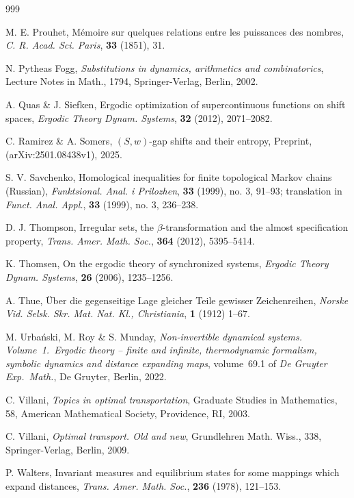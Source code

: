 \documentclass[reqno,11pt]{amsart}
\theoremstyle{definition}
\theoremstyle{remark}
\theoremstyle{remark}
\numberwithin{equation}{section}
\begin{document}
\begin{thebibliography}{999}
	
M. E. Prouhet,
M\'emoire sur quelques relations entre les puissances des
 nombres, {\it C. R. Acad. Sci. Paris}, {\bf 33} (1851), 31.

N. Pytheas Fogg,
{\it Substitutions in dynamics, arithmetics and combinatorics},
Lecture Notes in Math., 1794,
Springer-Verlag, Berlin, 2002.

A. Quas \& J. Siefken, 
Ergodic optimization of supercontinuous functions on shift spaces, 
{\it Ergodic Theory Dynam. Systems}, {\bf 32} (2012), 2071--2082.

 C. Ramirez \& A. Somers, $(S,w)$-gap shifts and their entropy,
Preprint, (arXiv:2501.08438v1), 2025.	

	 S. V. Savchenko, Homological inequalities for finite topological Markov chains
    (Russian), {\it Funktsional. Anal. i Prilozhen}, {\bf 33} (1999), no. 3, 91--93; translation in
{\it Funct. Anal. Appl.}, {\bf 33} (1999), no. 3, 236--238.

	


 D. J. Thompson, 
Irregular sets, the $\beta$-transformation and the almost specification property,
{\it Trans. Amer. Math. Soc.}, {\bf 364} (2012), 5395--5414.

 K. Thomsen, On the ergodic theory of synchronized systems,
{\it Ergodic Theory Dynam. Systems}, {\bf 26} (2006), 1235--1256.

 A. Thue, \"Uber die gegenseitige Lage gleicher Teile gewisser Zeichenreihen,
{\it Norske Vid. Selsk. Skr. Mat. Nat. Kl., Christiania}, {\bf 1} (1912) 1--67.

		M. Urba\'{n}ski, M. Roy \& S. Munday,
		\textit{Non-invertible dynamical systems. Volume~1.\ Ergodic theory -- finite and infinite, thermodynamic formalism, symbolic dynamics and distance expanding maps},
		volume~69.1 of \textit{De Gruyter Exp.\ Math.},
        De Gruyter, Berlin, 2022.

		
	 C. Villani, {\it Topics in optimal transportation},
Graduate Studies in Mathematics, 58,  American Mathematical Society, Providence, RI, 2003. 

 C. Villani, 
{\it Optimal transport.
Old and new},
Grundlehren Math. Wiss., 338,
Springer-Verlag, Berlin, 2009.



 P. Walters, Invariant measures and equilibrium states for some mappings which expand distances,
{\it Trans. Amer. Math. Soc.}, {\bf 236} (1978), 121--153.



\end{thebibliography}
\end{document}
